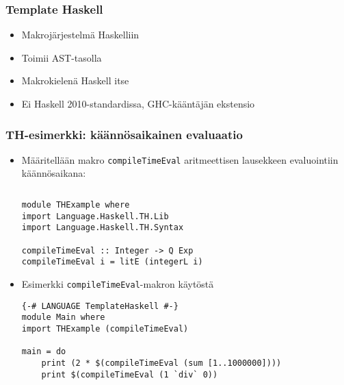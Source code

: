 \documentclass{beamer}
\begin{document}

\begin{frame}[fragile]
\frametitle{Template Haskell}
\begin{itemize}
\item{Makrojärjestelmä Haskelliin}
\item{Toimii AST-tasolla}
\item{Makrokielenä Haskell itse}
\item{Ei Haskell 2010-standardissa, GHC-kääntäjän ekstensio}
\end{itemize}
\end{frame}

\begin{frame}[fragile]
\frametitle{TH-esimerkki: käännösaikainen evaluaatio}
\begin{itemize}
\item{Määritellään makro \texttt{compileTimeEval} aritmeettisen lausekkeen evaluointiin käännösaikana:}
\begin{verbatim}
\end{verbatim}

\begin{verbatim}
module THExample where
import Language.Haskell.TH.Lib
import Language.Haskell.TH.Syntax

compileTimeEval :: Integer -> Q Exp
compileTimeEval i = litE (integerL i)
\end{verbatim}

\item{Esimerkki \texttt{compileTimeEval}-makron käytöstä}
\begin{verbatim}
{-# LANGUAGE TemplateHaskell #-}
module Main where
import THExample (compileTimeEval)

main = do
    print (2 * $(compileTimeEval (sum [1..1000000])))
    print $(compileTimeEval (1 `div` 0))
\end{verbatim}
\end{itemize}
\end{frame}
\end{document}
